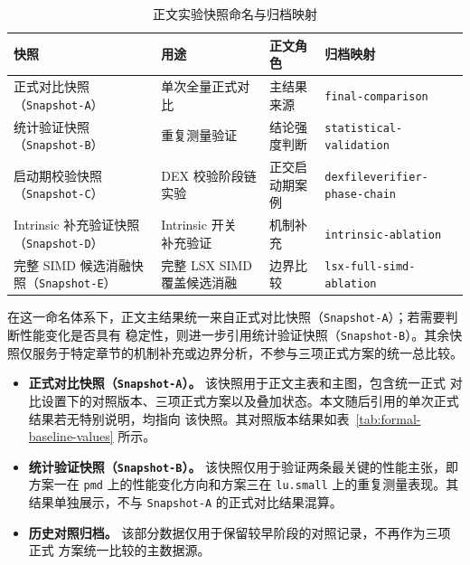 \begin{table}[htbp]
    \centering
    \scriptsize
    \caption{正文实验快照命名与归档映射}
    \label{tab:experiment-snapshots}
    \begin{tabular}{p{3.1cm}p{3.1cm}p{2.7cm}p{3.1cm}}
        \toprule
        \textbf{快照} & \textbf{用途} & \textbf{正文角色} & \textbf{归档映射} \\
        \midrule
        正式对比快照（\texttt{Snapshot-A}） & 单次全量正式对比 & 主结果来源 & \texttt{final-comparison} \\
        统计验证快照（\texttt{Snapshot-B}） & 重复测量验证 & 结论强度判断 & \texttt{statistical-validation} \\
        启动期校验快照（\texttt{Snapshot-C}） & DEX 校验阶段链实验 & 正交启动期案例 & \texttt{dexfileverifier-phase-chain} \\
        \shortstack[l]{Intrinsic 补充验证快照\\（\texttt{Snapshot-D}）} & \shortstack[l]{Intrinsic 开关\\补充验证} & 机制补充 & \texttt{intrinsic-ablation} \\
        完整 SIMD 候选消融快照（\texttt{Snapshot-E}） & 完整 LSX SIMD 覆盖候选消融 & 边界比较 & \texttt{lsx-full-simd-ablation} \\
        \bottomrule
    \end{tabular}
\end{table}

在这一命名体系下，正文主结果统一来自正式对比快照（\texttt{Snapshot-A}）；若需要判断性能变化是否具有
稳定性，则进一步引用统计验证快照（\texttt{Snapshot-B}）。其余快照仅服务于特定章节的机制补充或边界分析，不参与三项正式方案的统一总比较。

\begin{itemize}
    \item \textbf{正式对比快照（\texttt{Snapshot-A}）。} 该快照用于正文主表和主图，包含统一正式
    对比设置下的对照版本、三项正式方案以及叠加状态。本文随后引用的单次正式结果若无特别说明，均指向
    该快照。其对照版本结果如表~\ref{tab:formal-baseline-values} 所示。
    \item \textbf{统计验证快照（\texttt{Snapshot-B}）。} 该快照仅用于验证两条最关键的性能主张，即方案一在 \texttt{pmd} 上的性能变化方向和方案三在 \texttt{lu.small} 上的重复测量表现。其结果单独展示，不与 \texttt{Snapshot-A} 的正式对比结果混算。
    \item \textbf{历史对照归档。} 该部分数据仅用于保留较早阶段的对照记录，不再作为三项正式
    方案统一比较的主数据源。
\end{itemize}

